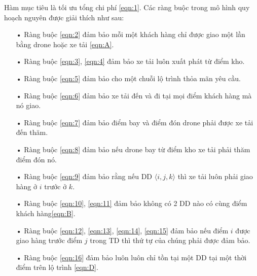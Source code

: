 \documentclass[a4paper,12pt]{report}
\begin{document}
Hàm mục tiêu là tối ưu tổng chi phí \eqref{eqn:1}.
Các ràng buộc trong mô hình quy hoạch nguyên được giải thích như sau:
\begin{itemize}
\item[•] Ràng buộc \eqref{eqn:2} đảm bảo mỗi một khách hàng chỉ được giao một lần bằng drone hoặc xe tải \eqref{eqn:A}.
\item[•] Ràng buộc \eqref{eqn:3}, \eqref{eqn:4} đảm bảo xe tải luôn xuất phát từ điểm kho.
\item[•] Ràng buộc \eqref{eqn:5} đảm bảo cho một chuỗi lộ trình thỏa mãn yêu cầu.
\item[•] Ràng buộc \eqref{eqn:6} đảm bảo xe tải đến và đi tại mọi điểm khách hàng mà nó giao.
\item[•] Ràng buộc \eqref{eqn:7} đảm bảo điểm bay và điểm đón drone phải được xe tải đến thăm.
\item[•] Ràng buộc \eqref{eqn:8} đảm bảo nếu drone bay từ điểm kho xe tải phải thăm điểm đón nó.
\item[•] Ràng buộc \eqref{eqn:9} đảm bảo rằng nếu \ac{DD} $\langle i,j,k \rangle $ thì xe tải luôn phải giao hàng ở $i$ trước ở $k$.
\item[•] Ràng buộc \eqref{eqn:10}, \eqref{eqn:11} đảm bảo không có 2 \ac{DD} nào có cùng điểm khách hàng\eqref{eqn:B}.
\item[•] Ràng buộc \eqref{eqn:12}, \eqref{eqn:13}, \eqref{eqn:14}, \eqref{eqn:15} đảm bảo nếu điểm $i$ được giao hàng trước điểm $j$ trong \ac{TD} thì thứ tự của chúng phải được đảm bảo.
\item[•] Ràng buộc \eqref{eqn:16} đảm bảo luôn luôn chỉ tồn tại một DD tại một thời điểm trên lộ trình \eqref{eqn:D}.
\end{itemize}
\end{document}

